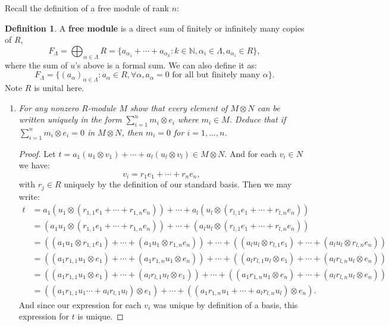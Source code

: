 \documentclass[10pt,oneside,reqno]{amsart}
\theoremstyle{plain}
\theoremstyle{definition}
\newtheorem{Def}[theorem]{Definition}
\theoremstyle{remark}
\newcommand{\n}{\mathbb{N}}
\newcommand{\bee}{\begin{equation}\begin{aligned}}
\newcommand{\eee}{\end{aligned}\end{equation}}
\newcommand{\tens}{\otimes}
\begin{document}
\begin{enumerate}[label=\arabic*.]
Recall the definition of a free module of rank $n$: 
\begin{Def}
A \textbf{free module} is a direct sum of finitely or infinitely many copies of $R$, 
$$
F_\Lambda = \bigoplus_{\alpha \in \Lambda}R = \{a_{\alpha_1} + \cdots + a_{\alpha_k}: k \in \n,\alpha_i \in \Lambda,a_{\alpha_i} \in R\},
$$
where the sum of $u$'s above is a formal sum. We can also define it as: 
$$
F_\Lambda = \{(a_\alpha)_{\alpha \in \Lambda}: a_\alpha \in R,\forall \alpha,a_\alpha = 0 \text{ for all but finitely many }\alpha\}.
$$
Note $R$ is unital here. 
\end{Def}

\begin{enumerate}
\item \textit{For any nonzero $R$-module $M$ show that every element of $M \tens N$ can be written uniquely in the form $\sum_{i = 1}^n m_i \tens e_i$ where $m_i \in M$. Deduce that if $\sum_{i  =1}^n m_i \tens e_i = 0$ in $M \tens N$, then $m_i = 0$ for $i  = 1,...,n$. }

\begin{proof}
Let $t = a_1(u_1 \otimes v_1) + \cdots + a_l(u_l \otimes v_l) \in M \tens N$. And for each $v_i \in N$ we have: 
$$
v_i = r_1e_1 + \cdots + r_ne_n,
$$
with $r_j \in R$ uniquely by the definition of our standard basis. Then we may write: 
\bee
t &= a_1(u_1 \tens (r_{1,1}e_1 + \cdots + r_{1,n}e_n)) + \cdots + a_l(u_l \tens (r_{l,1}e_1 + \cdots + r_{l,n}e_n))\\
&= (a_1u_1 \tens (r_{1,1}e_1 + \cdots + r_{1,n}e_n)) + \cdots + (a_lu_l \tens (r_{l,1}e_1 + \cdots + r_{l,n}e_n))\\
&= ((a_1u_1 \tens r_{1,1}e_1) + \cdots + (a_1u_1 \tens r_{1,n}e_n)) + \cdots + ((a_lu_l \tens r_{l,1}e_1) + \cdots + (a_lu_l \tens r_{l,n}e_n))\\
&= ((a_1r_{1,1}u_1 \tens e_1) + \cdots + (a_1r_{1,n}u_1 \tens e_n)) + \cdots + ((a_lr_{l,1}u_l \tens e_1) + \cdots + (a_lr_{l,n}u_l \tens e_n))\\
&= ((a_1r_{1,1}u_1 \tens e_1) + \cdots + (a_lr_{l,1}u_l \tens e_1) ) + \cdots + ((a_1r_{1,n}u_1 \tens e_n) + \cdots + (a_lr_{l,n}u_l \tens e_n))\\
&= ((a_1r_{1,1}u_1 \cdots + a_lr_{l,1}u_l) \tens e_1)  + \cdots + ((a_1r_{1,n}u_1  + \cdots + a_lr_{l,n}u_l) \tens e_n).
\eee
And since our expression for each $v_i$ was unique by definition of a basis, this expression for $t$ is unique. 


\end{proof}
\end{enumerate}
\end{enumerate}
\end{document}
